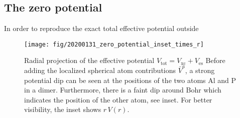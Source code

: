 \documentclass[oribibl]{llncs}
\newcommand{\um}[1]{_{\mathrm{#1}}}
\begin{document}
\subsection{The zero potential}

In order to reproduce the exact total effective potential outside 
%
\begin{figure}
  \begin{minipage}[c]{.990\textwidth}
	\texttt{[image: fig/20200131\_zero\_potential\_inset\_times\_r]} %
  \end{minipage}\hfill
  \begin{minipage}[c]{.009\textwidth}
  \end{minipage}
  \label{fig:zero_potential}
  \caption{
	Radial projection of the effective potential $V\um{tot} = V\um{xc} + V\um{es}$
	Before adding the localized spherical atom contributions $\bar V^{a}$,
	a strong potential dip can be seen at the positions of the two atoms Al and P in a dimer.
	Furthermore, there is a faint dip around \unit[4]{Bohr} which indicates the position of the other atom, 
	see inset. For better visibility, the inset shows $r\,V(r)$.
  }
\end{figure}
%
%
\end{document}
